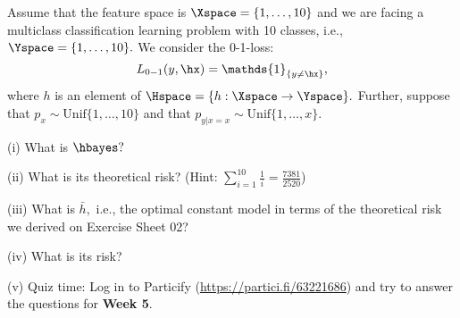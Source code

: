 


	Assume that the feature space is $\Xspace = \{1,\ldots,10\}$ and we are facing a multiclass classification learning problem with 10 classes, i.e.,  $\Yspace=\{1,\ldots,10\}.$
	We consider the 0-1-loss: $$ L_{0-1}(y,\hx) = \mathds{1}_{\{ y \ne \hx \}},$$
	where $h$ is an element of $\Hspace  = \{ h:\Xspace \to \Yspace  \}.$
	Further, suppose that $p_x \sim \mathrm{Unif}\{1,\ldots,10\}$ and that $p_{y|x=x} \sim \mathrm{Unif}\{1,\ldots,x\}.$
	\lz
	
	(i) What is $\hbayes?$ 
	
	\lz
	
	\lz 
	\lz 
	
		
	\lz
	
	\lz 
	\lz 
	
	
	(ii) What is its theoretical risk? (Hint: $\sum_{i=1}^{10} \frac{1}{i} = \frac{7381}{2520}$)
	 
	 	
	\lz
	
	\lz 
	\lz 
	
		
	\lz
	
	\lz 
	\lz 
	
	
	

	
	(iii) What is $\bar h,$ i.e., the optimal constant model in terms of the theoretical risk we derived on Exercise Sheet 02?
	
	
	\lz
	
	\lz 
	\lz 
	
		
	\lz
	
	\lz 
	\lz 
	
	
	(iv) What is its risk?
	
	
	
		\lz
	
	\lz 
	\lz 
	
		
	\lz
	
	\lz 
	\lz 
	
	
	
	

  (v) Quiz time: Log in to Particify (\url{https://partici.fi/63221686}) and try to answer the questions for \textbf{Week 5}.

	 
